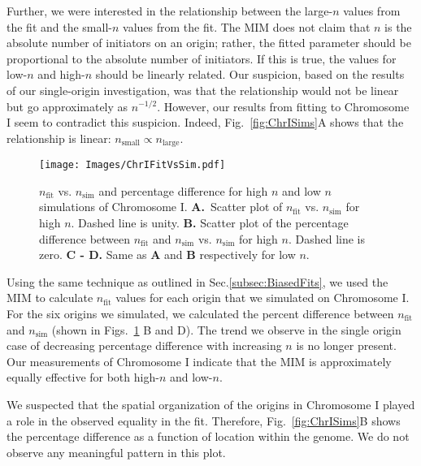 	Further, we were interested in the relationship between the large-$n$ values from the fit and the small-$n$ values from the fit.
	The MIM does not claim that $n$ is the absolute number of initiators on an origin; rather, the fitted parameter should be proportional to the absolute number of initiators.
	If this is true, the values for low-$n$ and high-$n$ should be linearly related.
	Our suspicion, based on the results of our single-origin investigation, was that the relationship would not be linear but go approximately as $n^{-1/2}$.
	However, our results from fitting to Chromosome I seem to contradict this suspicion.
	Indeed, Fig.~\ref{fig:ChrISims}A shows that the relationship is linear: $n_\text{small} \propto n_\text{large}$.
		
	\begin{figure}[tbh!]
		\begin{center}
			\texttt{[image: Images/ChrIFitVsSim.pdf]}
		\end{center}
			\caption[Chromosome I $n_\text{fit}$ vs. $n_\text{sim}$ and Percentage Difference]{\label{fig:ChrIFitVsSim}
				$n_\text{fit}$ vs. $n_\text{sim}$ and percentage difference for high $n$ and low $n$ simulations of Chromosome I.
				\textbf{A.}~Scatter plot of $n_\text{fit}$ vs. $n_\text{sim}$ for high $n$.
				Dashed line is unity.
				\textbf{B.}  Scatter plot of the percentage difference between $n_\text{fit}$ and $n_\text{sim}$ vs. $n_\text{sim}$ for high $n$.
				Dashed line is zero.
				\textbf{C - D.} Same as \textbf{A} and \textbf{B} respectively for low $n$.
			}
	\end{figure} 
	
	Using the same technique as outlined in Sec.\ref{subsec:BiasedFits}, we used the MIM to calculate $n_\text{fit}$ values for each origin that we simulated on Chromosome I.
	For the six origins we simulated, we calculated the percent difference between $n_\text{fit}$ and $n_\text{sim}$ (shown in Figs.~\ref{fig:ChrIFitVsSim} B and D).
	The trend we observe in the single origin case of decreasing percentage difference with increasing $n$ is no longer present.
	Our measurements of Chromosome I indicate that the MIM is approximately equally effective for both high-$n$ and low-$n$.
	
	We suspected that the spatial organization of the origins in Chromosome I played a role in the observed equality in the fit.
	Therefore, Fig.~\ref{fig:ChrISims}B shows the percentage difference as a function of location within the genome.
	We do not observe any meaningful pattern in this plot.
	
